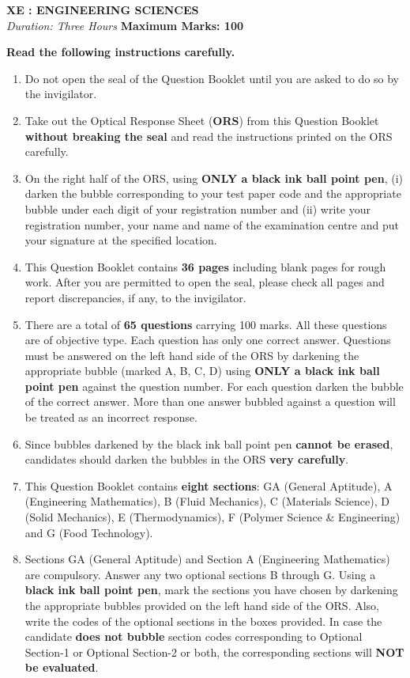 \documentclass[12pt]{article}
\begin{document}
\begin{center}
    {\Large \textbf{XE : ENGINEERING SCIENCES}} \\
    \textit{Duration: Three Hours} \hfill \textbf{Maximum Marks: 100}
\end{center}

\noindent\textbf{Read the following instructions carefully.}

\begin{enumerate}[leftmargin=*]
    \item Do not open the seal of the Question Booklet until you are asked to do so by the invigilator.
    \item Take out the Optical Response Sheet (\textbf{ORS}) from this Question Booklet \textbf{without breaking the seal} and read the instructions printed on the ORS carefully.
    \item On the right half of the ORS, using \textbf{ONLY a black ink ball point pen}, (i) darken the bubble corresponding to your test paper code and the appropriate bubble under each digit of your registration number and (ii) write your registration number, your name and name of the examination centre and put your signature at the specified location.
    \item This Question Booklet contains \textbf{36 pages} including blank pages for rough work. After you are permitted to open the seal, please check all pages and report discrepancies, if any, to the invigilator.
    \item There are a total of \textbf{65 questions} carrying 100 marks. All these questions are of objective type. Each question has only one correct answer. Questions must be answered on the left hand side of the ORS by darkening the appropriate bubble (marked A, B, C, D) using \textbf{ONLY a black ink ball point pen} against the question number. For each question darken the bubble of the correct answer. More than one answer bubbled against a question will be treated as an incorrect response.
    \item Since bubbles darkened by the black ink ball point pen \textbf{cannot be erased}, candidates should darken the bubbles in the ORS \textbf{very carefully}.
    \item This Question Booklet contains \textbf{eight sections}: GA (General Aptitude), A (Engineering Mathematics), B (Fluid Mechanics), C (Materials Science), D (Solid Mechanics), E (Thermodynamics), F (Polymer Science \& Engineering) and G (Food Technology).
    \item Sections GA (General Aptitude) and Section A (Engineering Mathematics) are compulsory. Answer any two optional sections B through G. Using a \textbf{black ink ball point pen}, mark the sections you have chosen by darkening the appropriate bubbles provided on the left hand side of the ORS. Also, write the codes of the optional sections in the boxes provided. In case the candidate \textbf{does not bubble} section codes corresponding to Optional Section-1 or Optional Section-2 or both, the corresponding sections will \textbf{NOT be evaluated}.

\end{enumerate}
\end{document}
